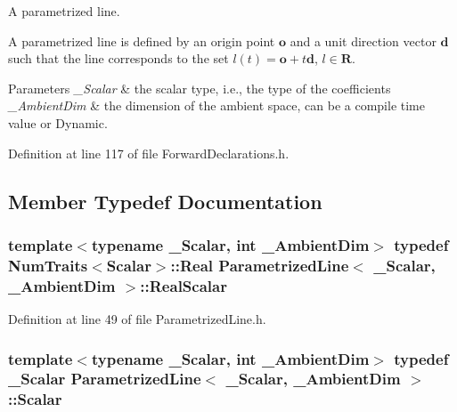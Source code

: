 A parametrized line. 

A parametrized line is defined by an origin point $ \mathbf{o} $ and a unit direction vector $ \mathbf{d} $ such that the line corresponds to the set $ l(t) = \mathbf{o} + t \mathbf{d} $, $ l \in \mathbf{R} $.


\begin{DoxyParams}{Parameters}
{\em \-\_\-\-Scalar} & the scalar type, i.\-e., the type of the coefficients \\
\hline
{\em \-\_\-\-Ambient\-Dim} & the dimension of the ambient space, can be a compile time value or Dynamic. \\
\hline
\end{DoxyParams}


Definition at line 117 of file Forward\-Declarations.\-h.



\subsection{Member Typedef Documentation}
\hypertarget{class_parametrized_line_a5a5bc8e0f892d08922cd4152622a1ea3}{
\subsubsection[{Real\-Scalar}]{\setlength{\rightskip}{0pt plus 5cm}template$<$typename \-\_\-\-Scalar, int \-\_\-\-Ambient\-Dim$>$ typedef {\bf Num\-Traits}$<${\bf Scalar}$>$\-::Real {\bf Parametrized\-Line}$<$ \-\_\-\-Scalar, \-\_\-\-Ambient\-Dim $>$\-::{\bf Real\-Scalar}}}\label{class_parametrized_line_a5a5bc8e0f892d08922cd4152622a1ea3}


Definition at line 49 of file Parametrized\-Line.\-h.

\hypertarget{class_parametrized_line_ac4e083e5a62740e45d2158c6692b2115}{
\subsubsection[{Scalar}]{\setlength{\rightskip}{0pt plus 5cm}template$<$typename \-\_\-\-Scalar, int \-\_\-\-Ambient\-Dim$>$ typedef \-\_\-\-Scalar {\bf Parametrized\-Line}$<$ \-\_\-\-Scalar, \-\_\-\-Ambient\-Dim $>$\-::{\bf Scalar}}}\label{class_parametrized_line_ac4e083e5a62740e45d2158c6692b2115}


